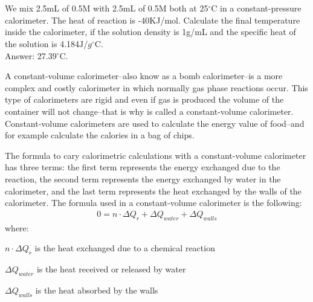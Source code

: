 \documentclass[main.tex]{subfiles}
\begin{document}
\begin{description}
\begin{example}
\\
\faDiamond\ \\
We mix 2.5mL of  0.5M with 2.5mL of  0.5M both at 25$^{\circ}$C in a constant-pressure calorimeter. The heat of reaction is -40KJ/mol. Calculate the final temperature inside the calorimeter, if the solution density is 1g/mL and the specific heat of the solution is 4.184$\text{J}/g^{\circ}\text{C}$.
\\
\flushright Answer: 27.39$^{\circ}$C.
\end{example}%






\item[\docfilehook{Constant-volume calorimeter}{ }] 
A constant-volume calorimeter--also know as a bomb calorimeter--is a more complex and costly calorimeter in which normally gas phase reactions occur. This type of calorimeters are rigid and even if gas is produced the volume of the container will not change--that is why is called a constant-volume calorimeter. Constant-volume calorimeters are used to calculate the energy value of food--and for example calculate the calories in a bag of chips. 


The formula to cary calorimetric calculations with a constant-volume calorimeter has three terms: the first term represents the energy exchanged due to the reaction, the second term represents the energy exchanged by water in the calorimeter, and the last term represents the heat exchanged by the walls of the calorimeter. The formula used in a constant-volume calorimeter is the following: 
\begin{equation*}\begin{split}
 0=n\cdot\Delta Q_{r}+\Delta Q_{water}+\Delta Q_{walls} 
\end{split}\end{equation*}
where:
\begin{where}
 \item $n\cdot\Delta Q_{r}$   is the heat exchanged due to a chemical reaction
\item $\Delta Q_{water}$    is the heat received or released by water 
 \item $\Delta Q_{walls}$   is the heat absorbed by the walls
\end{where}


\end{description}
\end{document}
